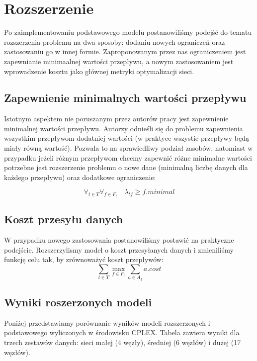 \section{Rozszerzenie}

Po zaimplementowaniu podstawowego modelu postanowiliśmy podejść do tematu
rozszerzenia problemu na dwa sposoby: dodaniu nowych ograniczeń
oraz zastosowaniu go w innej formie. Zaproponowanym przez nas ograniczeniem jest
zapewnianie minimaalnej wartości przepływu, a nowym zastosowaniem jest wprowadzenie
kosztu jako głównej metryki optymalizacji sieci.

\subsection{Zapewnienie minimalnych wartości przepływu}

Istotnym aspektem nie poruszanym przez autorów pracy jest zapewnienie
minimalnej wartości przepływu. Autorzy odnieśli się do problemu zapewnienia wszystkim
przepływom dodatniej wartości (w praktyce wszystie przepływy będą miały równą wartość).
Pozwala to na sprawiedliwy podział zasobów, natomiast w przypadku jeżeli różnym
przepływom chcemy zapewnić różne minimalne wartości potrzebne jest rozszerzenie problemu
o nowe dane (minimalną liczbę danych dla każdego przepływu) oraz dodatkowe ograniczenie:

\begin{equation}
  \forall_{t \in T} \forall_{f \in F_t} \quad \lambda_{tf} \ge f.minimal
\end{equation}

\subsection{Koszt przesyłu danych}

W przypadku nowego zastosowania postanowiliśmy postawić na praktyczne podejście.
Rozszerzylismy model o koszt przesyłanych danych i zmieniliśmy funkcję celu tak,
by zrównoważyć koszt przepływów:
\begin{equation}
  \sum_{t \in T} \max_{f \in F_t} \sum_{a \in A_f} a.cost
\end{equation}

\subsection{Wyniki roszerzonych modeli}
Poniżej przedstawiamy porównanie wyników modeli rozszerzonych i podstawowego wyliczonych
w środowisku CPLEX. Tabela zawiera wyniki dla trzech zestawów danych: sieci małej (4 węzły),
średniej (6 węzłów) i dużej (17 węzłów).
